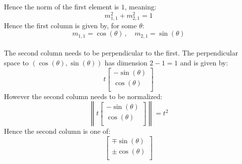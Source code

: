 Hence the norm of the first element is $1$, meaning:
\[m_{1,1}^2+m_{2,1}^2=1\]
Hence the first column is given by, for some $\theta$:
\[m_{1,1} = \cos(\theta)\,,\quad m_{2,1} = \sin(\theta)\]
\\
The second column needs to be perpendicular to the first.
The perpendicular space to $(\cos(\theta),\sin(\theta))$ has dimension $2-1 = 1$ and is given by:
\[
t
\begin{bmatrix}
	-\sin(\theta) \\ \cos(\theta)\\
\end{bmatrix}
\]
However the second column needs to be normalized:
\[
\left\|
t
\begin{bmatrix}
	-\sin(\theta) \\ \cos(\theta)\\
\end{bmatrix}
\right\|
= t^2
\]
Hence the second column is one of:
\[
\begin{bmatrix}
	\mp\sin(\theta) \\ \pm\cos(\theta)\\
\end{bmatrix}
\]

